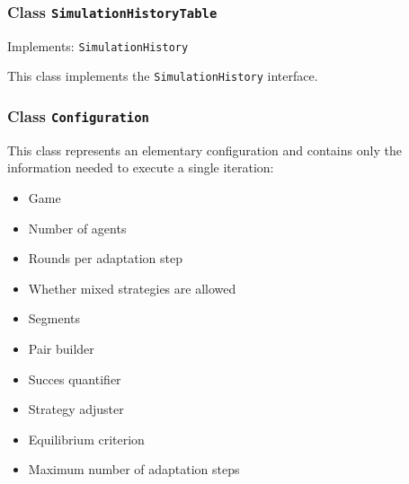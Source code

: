 \documentclass[parskip=full,11pt]{scrartcl}
\begin{document}
\subsubsection{Class \texttt{SimulationHistoryTable}}
Implements: \texttt{SimulationHistory}

This  class implements the \texttt{SimulationHistory} interface.

\subsubsection{Class \texttt{Configuration}}
This class represents an elementary configuration and contains only the information needed to execute a single iteration:
\begin{itemize}\itemsep -10pt
\item Game
\item Number of agents
\item Rounds per adaptation step
\item Whether mixed strategies are allowed
\item Segments
\item Pair builder
\item Succes quantifier
\item Strategy adjuster
\item Equilibrium criterion
\item Maximum number of adaptation steps
\end{itemize}
\end{document}
